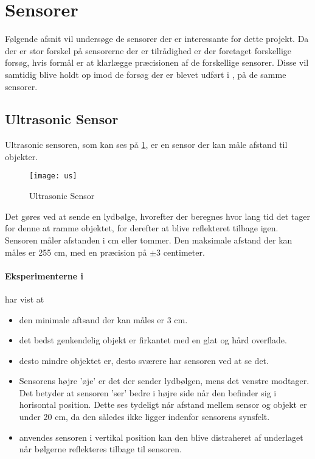 \section{Sensorer}
Følgende afsnit vil undersøge de sensorer der er interessante for dette projekt.
Da der er stor forskel på sensorerne der er tilrådighed er der foretaget forskellige forsøg, hvis formål er at klarlægge præcisionen af de forskellige sensorer.
Disse vil samtidig blive holdt op imod de forsøg der er blevet udført i \cite{tikNXT}, på de samme sensorer.

\subsection{Ultrasonic Sensor}
Ultrasonic sensoren, som kan ses på \cref{sensor:ultrasonic_sensor}, er en sensor der kan måle afstand til objekter.

\begin{figure}[h]
\centering
\texttt{[image: us]}
\caption{\legoms Ultrasonic Sensor}
\label{sensor:ultrasonic_sensor}
\end{figure}

Det gøres ved at sende en lydbølge, hvorefter der beregnes hvor lang tid det tager for denne at ramme objektet, for derefter at blive reflekteret tilbage igen.
Sensoren måler afstanden i cm eller tommer.
Den maksimale afstand der kan måles er 255 cm, med en præcision på $\pm$3 centimeter.\cite{tikNXT}

\paragraph{Eksperimenterne i \cite{tikNXT}} har vist at
\begin{itemize}
\item den minimale aftsand der kan måles er 3 cm.
\item det bedst genkendelig objekt er firkantet med en glat og hård overflade.
\item desto mindre objektet er, desto sværere har sensoren ved at se det.
\item Sensorens højre 'øje' er det der sender lydbølgen, mens det venstre modtager.
Det betyder at sensoren 'ser' bedre i højre side når den befinder sig i horisontal position.
Dette ses tydeligt når afstand mellem sensor og objekt er under 20 cm, da den således ikke ligger indenfor sensorens synsfelt.
\item anvendes sensoren i vertikal position kan den blive distraheret af underlaget når bølgerne reflekteres tilbage til sensoren.
\end{itemize}


